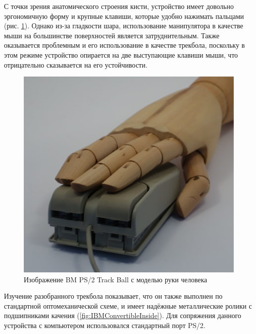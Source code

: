 \documentclass[11pt, a4paper]{article}
\begin{document}
С точки зрения анатомического строения кисти, устройство имеет довольно эргономичную  форму и крупные клавиши, которые удобно нажимать пальцами (рис. \ref{fig:IBMConvertibleHand}). Однако из-за гладкости шара, использование манипулятора в качестве мыши на большинстве поверхностей является  затруднительным. Также оказывается проблемным и его использование в качестве трекбола, поскольку в этом режиме устройство опирается на две выступающие клавиши мыши, что отрицательно сказывается на его устойчивости.

\begin{figure}[h]
    \centering
    \includegraphics[scale=0.5]{1992_ibm_convertible/2.11.JPG}
    \caption{Изображение BM PS/2 Track Ball с моделью руки человека}
    \label{fig:IBMConvertibleHand}
\end{figure}

Изучение разобранного трекбола показывает, что он также выполнен по стандартной оптомеханической схеме, и имеет надёжные металлические ролики с подшипниками качения (\ref{fig:IBMConvertibleInside}). Для сопряжения данного устройства с компьютером использовался стандартный порт PS/2.
\end{document}
